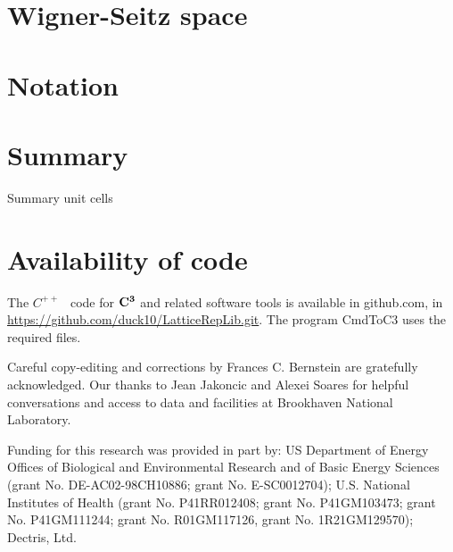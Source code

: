 \documentclass[preprint]{iucr}              %
\numberwithin{equation}{section}
\newcommand{\CIII}[0]{$\bf{C^{3}}$}
\begin{document}
\section{Wigner-Seitz space}


	
	
	
	
	\section{Notation}
	

	
	\section{Summary}
	
	Summary unit cells
	
	
	
	
	
	
	\section{Availability of code}
	
	The $C^{++}$ ~code for \CIII{} and related 
	software tools is available in github.com, in
	\url{https://github.com/duck10/LatticeRepLib.git}.
	The program CmdToC3 uses the required files.
	
	
	
	
	Careful copy-editing and corrections by Frances C. Bernstein are 
	gratefully acknowledged.
	Our thanks to Jean Jakoncic and Alexei Soares for 
	helpful conversations and access to data and facilities at 
	Brookhaven National Laboratory.
	
	
	Funding for this research was provided in part by:  
	US Department of Energy Offices of Biological and 
	Environmental Research and of Basic Energy Sciences 
	(grant No. DE-AC02-98CH10886; grant No. E-SC0012704); 
	U.S. National Institutes of Health (grant No. P41RR012408; 
	grant No. P41GM103473; grant No. P41GM111244; 
	grant No. R01GM117126,
	grant No. 1R21GM129570); Dectris, Ltd.
	
	
	
	
\end{document}
